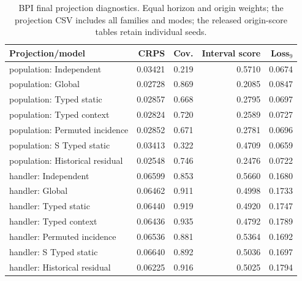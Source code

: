 \begin{table}[t]
\centering\small
\caption{BPI final projection diagnostics. Equal horizon and origin weights; the projection CSV includes all families and modes; the released origin-score tables retain individual seeds.}\label{tab:bpiprojection}
\begin{tabular}{lrrrr}
\toprule
Projection/model & CRPS & Cov. & Interval score & Loss$_9$ \\
\midrule
population: Independent & 0.03421 & 0.219 & 0.5710 & 0.0674 \\
population: Global & 0.02728 & 0.869 & 0.2085 & 0.0847 \\
population: Typed static & 0.02857 & 0.668 & 0.2795 & 0.0697 \\
population: Typed context & 0.02824 & 0.720 & 0.2589 & 0.0727 \\
population: Permuted incidence & 0.02852 & 0.671 & 0.2781 & 0.0696 \\
population: S Typed static & 0.03413 & 0.322 & 0.4709 & 0.0659 \\
population: Historical residual & 0.02548 & 0.746 & 0.2476 & 0.0722 \\
handler: Independent & 0.06599 & 0.853 & 0.5660 & 0.1680 \\
handler: Global & 0.06462 & 0.911 & 0.4998 & 0.1733 \\
handler: Typed static & 0.06440 & 0.919 & 0.4920 & 0.1747 \\
handler: Typed context & 0.06436 & 0.935 & 0.4792 & 0.1789 \\
handler: Permuted incidence & 0.06536 & 0.881 & 0.5364 & 0.1692 \\
handler: S Typed static & 0.06640 & 0.892 & 0.5036 & 0.1697 \\
handler: Historical residual & 0.06225 & 0.916 & 0.5025 & 0.1794 \\
\bottomrule
\end{tabular}
\end{table}
